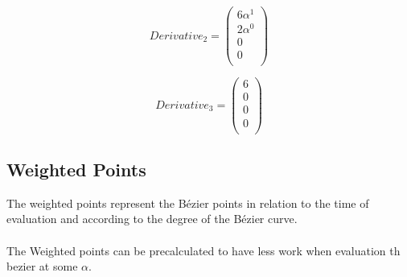 \begin{equation}
    Derivative_2=\left(
    \begin{array}{cccc}
        6 \alpha ^1 \\
        2 \alpha ^0 \\
        0           \\
        0           \\
    \end{array}
    \right)
\end{equation}

\begin{equation}
    Derivative_3=\left(
    \begin{array}{cccc}
        6 \\
        0 \\
        0 \\
        0 \\
    \end{array}
    \right)
\end{equation}

\subsection{Weighted Points}

The weighted points represent the Bézier points in relation to the time of evaluation and according to the degree of the Bézier curve.
\\\\
The Weighted points can be precalculated to have  less work when evaluation th bezier at some $\alpha$.

